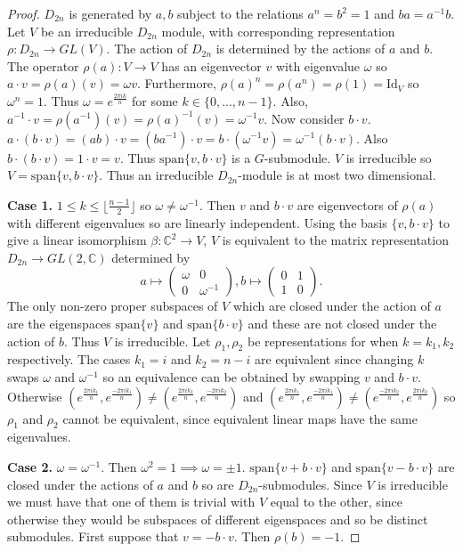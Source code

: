 \documentclass{article}
\begin{document}
\begin{proof}
$D_{2n}$ is generated by $a,b$ subject to the relations $a^n=b^2=1$ and $ba=a^{-1}b$. Let $V$ be an irreducible $D_{2n}$ module, with corresponding representation $\rho:D_{2n}\to GL(V)$. The action of $D_{2n}$ is determined by the actions of $a$ and $b$. The operator $\rho(a):V\to V$ has an eigenvector $v$ with eigenvalue $\omega$ so $a\cdot v=\rho(a)(v)=\omega v$. Furthermore, $\rho(a)^n=\rho(a^n)=\rho(1)=\text{Id}_V$ so $\omega^n=1$. Thus $\omega=e^{\frac{2\pi ik}{n}}$ for some $k\in\{0,...,n-1\}$. Also, $a^{-1}\cdot v=\rho(a^{-1})(v)=\rho(a)^{-1}(v)=\omega^{-1}v$. Now consider $b\cdot v$. $a\cdot(b\cdot v)=(ab)\cdot v=(ba^{-1})\cdot v=b\cdot(\omega^{-1}v)=\omega^{-1}(b\cdot v)$. Also $b\cdot(b\cdot v)=1\cdot v=v$. Thus $\text{span}\{v,b\cdot v\}$ is a $G$-submodule. $V$ is irreducible so $V=\text{span}\{v,b\cdot v\}$. Thus an irreducible $D_{2n}$-module is at most two dimensional.

\textbf{Case 1.} $1\leq k\leq \lfloor\frac{n-1}{2}\rfloor$ so $\omega\neq\omega^{-1}$. Then $v$ and $b\cdot v$ are eigenvectors of $\rho(a)$ with different eigenvalues so are linearly independent. Using the basis $\{v,b\cdot v\}$ to give a linear isomorphism $\beta:\mathbb{C}^2\to V$, $V$ is equivalent to the matrix representation $D_{2n}\to GL(2,\mathbb{C})$ determined by\[a\mapsto
\begin{pmatrix}
\omega & 0 \\
0 & \omega^{-1}
\end{pmatrix},b\mapsto\begin{pmatrix}
0 & 1 \\
1 & 0
\end{pmatrix}.\]The only non-zero proper subspaces of $V$ which are closed under the action of $a$ are the eigenspaces $\text{span}\{v\}$ and $\text{span}\{b\cdot v\}$ and these are not closed under the action of $b$. Thus $V$ is irreducible.
Let $\rho_1,\rho_2$ be representations for when $k=k_1,k_2$ respectively.
The cases $k_1=i$ and $k_2=n-i$ are equivalent since changing $k$ swaps $\omega$ and $\omega^{-1}$ so an equivalence can be obtained by swapping $v$ and $b\cdot v$. Otherwise $(e^{\frac{2\pi ik_1}{n}},e^{\frac{-2\pi ik_1}{n}})\neq(e^{\frac{2\pi ik_2}{n}},e^{\frac{-2\pi ik_2}{n}})$ and $(e^{\frac{2\pi ik_1}{n}},e^{\frac{-2\pi ik_1}{n}})\neq(e^{\frac{-2\pi ik_2}{n}},e^{\frac{2\pi ik_2}{n}})$ so $\rho_1$ and $\rho_2$ cannot be equivalent, since equivalent linear maps have the same eigenvalues.

\textbf{Case 2.} $\omega=\omega^{-1}$. Then $\omega^2=1\implies\omega=\pm1$. $\text{span}\{v+b\cdot v\}$ and $\text{span}\{v-b\cdot v\}$ are closed under the actions of $a$ and $b$ so are $D_{2n}$-submodules. Since $V$ is irreducible we must have that one of them is trivial with $V$ equal to the other, since otherwise they would be subspaces of different eigenspaces and so be distinct submodules. First suppose that $v=-b\cdot v$. Then $\rho(b)=-1$.


\end{proof}
\end{document}
